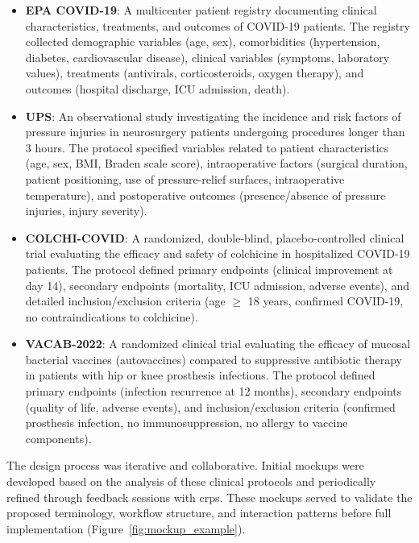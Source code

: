 \documentclass[conference,onecolumn]{IEEEtran}
\begin{document}
\begin{itemize}
    \item \textbf{EPA COVID-19}: A multicenter patient registry documenting clinical characteristics, treatments, and outcomes of COVID-19 patients. The registry collected demographic variables (age, sex), comorbidities (hypertension, diabetes, cardiovascular disease), clinical variables (symptoms, laboratory values), treatments (antivirals, corticosteroids, oxygen therapy), and outcomes (hospital discharge, ICU admission, death).
    
    \item \textbf{UPS}: An observational study investigating the incidence and risk factors of pressure injuries in neurosurgery patients undergoing procedures longer than 3 hours. The protocol specified variables related to patient characteristics (age, sex, BMI, Braden scale score), intraoperative factors (surgical duration, patient positioning, use of pressure-relief surfaces, intraoperative temperature), and postoperative outcomes (presence/absence of pressure injuries, injury severity).
    
    \item \textbf{COLCHI-COVID}: A randomized, double-blind, placebo-controlled clinical trial evaluating the efficacy and safety of colchicine in hospitalized COVID-19 patients. The protocol defined primary endpoints (clinical improvement at day 14), secondary endpoints (mortality, ICU admission, adverse events), and detailed inclusion/exclusion criteria (age $\geq$ 18 years, confirmed COVID-19, no contraindications to colchicine).
    
    \item \textbf{VACAB-2022}: A randomized clinical trial evaluating the efficacy of mucosal bacterial vaccines (autovaccines) compared to suppressive antibiotic therapy in patients with hip or knee prosthesis infections. The protocol defined primary endpoints (infection recurrence at 12 months), secondary endpoints (quality of life, adverse events), and inclusion/exclusion criteria (confirmed prosthesis infection, no immunosuppression, no allergy to vaccine components).
\end{itemize}  
  
The design process was iterative and collaborative. Initial mockups were developed based on the analysis of these clinical protocols and periodically refined through feedback sessions with \glspl{crp}. These mockups served to validate the proposed terminology, workflow structure, and interaction patterns before full implementation (Figure~\ref{fig:mockup_example}).
\end{document}
